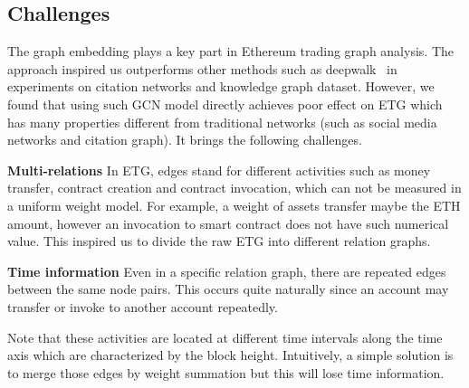 \subsection{Challenges}
The graph embedding plays a key part in Ethereum trading graph analysis. The approach \cite{kipf2016semi} inspired us outperforms other methods such as deepwalk~\cite{perozzi2014deepwalk} in experiments on citation networks and knowledge graph dataset. However, we found that using such GCN model directly achieves poor effect on ETG which has many properties different from traditional networks (such as social media networks and citation graph). It brings the following challenges.


\textbf{Multi-relations} In ETG, edges stand for different activities such as money transfer, contract creation and contract invocation, which can not be measured in a uniform weight model. For example, a weight of assets transfer maybe the ETH amount, however an invocation to smart contract does not have such numerical value. This inspired us to divide the raw ETG into different relation graphs.



\textbf{Time information} Even in a specific relation graph, there are repeated edges between the same node pairs. This occurs quite naturally since an account may transfer or invoke to another account repeatedly.

Note that these activities are located at different time intervals along the time axis which are characterized by the block height. Intuitively, a simple solution is to merge those edges by weight summation but this will lose time information. 

